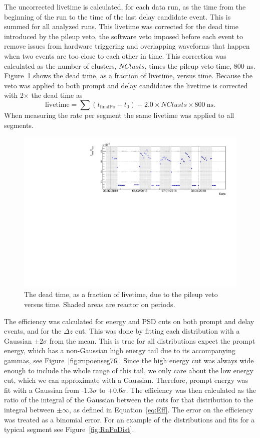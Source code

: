 The uncorrected livetime is calculated, for each data run, as the time from the beginning of the run to the time of the last delay candidate event. 
This is summed for all analyzed runs. 
This livetime was corrected for the dead time introduced by the pileup veto, the software veto imposed before each event to remove issues from hardware triggering and overlapping waveforms that happen when two events are too close to each other in time.
This correction was calculated as the number of clusters, $NClusts$, times the pileup veto time, 800 ns.
Figure~\ref{fig:vetotimevstime} shows the dead time, as a fraction of livetime, versus time.
Because the veto was applied to both prompt and delay candidates the livetime is corrected with 2$\times$ the dead time as
\begin{equation}
	\textrm{livetime} = \sum(t_{\textrm{finalPo}} - t_0) - 2.0 \times NClusts \times 800~\textrm{ns}.
\end{equation}
When measuring the rate per segment the same livetime was applied to all segments. 

\begin{figure}[!t]
	\centering
	\includegraphics[width=0.8\linewidth]{tex/6-ac227-images/AD_RateCalc/VetoTimeVsTime}
	\caption{The dead time, as a fraction of livetime, due to the pileup veto versus time. Shaded areas are reactor on periods.}
	\label{fig:vetotimevstime}
\end{figure}

The efficiency was calculated for energy and PSD cuts on both prompt and delay events, and for the $\Delta z$ cut.
This was done by fitting each distribution with a Gaussian $\pm 2\sigma$ from the mean.
This is true for all distributions expect the prompt energy, which has a non-Gaussian high energy tail due to its accompanying gammas, see Figure~\ref{fig:rnpoenseg76}. 
Since the high energy cut was always wide enough to include the whole range of this tail, we only care about the low energy cut, which we can approximate with a Gaussian.
Therefore, prompt energy was fit with a Gaussian from -1.3$\sigma$ to +0.6$\sigma$.
The efficiency was then calculated as the ratio of the integral of the Gaussian
between the cuts for that distribution to the integral between $\pm \infty$, as defined in Equation~\ref{eq:Eff}.
The error on the efficiency was treated as a binomial error.
For an example of the distributions and fits for a typical segment see Figure~\ref{fig:RnPoDist}.

